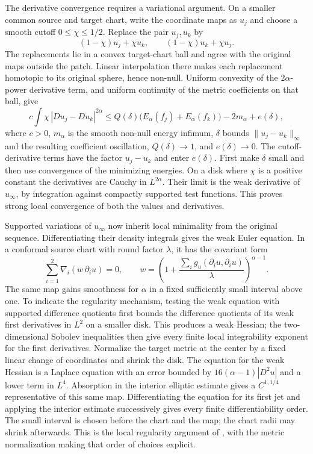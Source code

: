 The derivative convergence requires a variational argument. On a
smaller common source and target chart, write the coordinate maps as
$u_j$ and choose a smooth cutoff $0\leq\chi\leq1/2$. Replace the pair
$u_j,u_k$ by
\[
 (1-\chi)u_j+\chi u_k,\qquad
 (1-\chi)u_k+\chi u_j.
\]
The replacements lie in a convex target-chart ball and agree with the
original maps outside the patch. Linear interpolation there makes
each replacement homotopic to its original sphere, hence non-null.
Uniform convexity of the $2\alpha$-power derivative term, and uniform
continuity of the metric coefficients on that ball, give
\[
 c\int\chi\,|Du_j-Du_k|^{2\alpha}
 \leq Q(\delta)\bigl(E_\alpha(f_j)+E_\alpha(f_k)\bigr)
       -2m_\alpha+e(\delta),
\]
where $c>0$, $m_\alpha$ is the smooth non-null energy infimum,
$\delta$ bounds $\|u_j-u_k\|_\infty$ and the resulting coefficient
oscillation, $Q(\delta)\to1$, and $e(\delta)\to0$.
The cutoff-derivative terms have the factor $u_j-u_k$ and enter
$e(\delta)$. First make $\delta$ small and then use convergence of
the minimizing energies. On a disk where $\chi$ is a positive
constant the derivatives are Cauchy in $L^{2\alpha}$. Their limit is
the weak derivative of $u_\infty$, by integration against compactly
supported test functions. This proves strong local convergence of
both the values and derivatives.

Supported variations of $u_\infty$ now inherit local minimality from
the original sequence. Differentiating their density integrals gives
the weak Euler equation. In a conformal source chart with round
factor $\lambda$, it has the covariant form
\[
 \sum_{i=1}^2\nabla_i(w\,\partial_i u)=0,\qquad
 w=\left(1+\frac{\sum_i g_u(\partial_i u,\partial_i u)}{\lambda}\right)^{\alpha-1}.
\]
The same map gains smoothness for $\alpha$ in a fixed sufficiently
small interval above one. To indicate the regularity mechanism,
testing the weak equation with supported difference quotients first
bounds the difference quotients of its weak first derivatives in
$L^2$ on a smaller disk. This produces a weak Hessian; the
two-dimensional Sobolev inequalities then give every finite local
integrability exponent for the first derivatives. Normalize the
target metric at the center by a fixed linear change of coordinates
and shrink the disk. The equation for the weak Hessian is a Laplace
equation with an error bounded by
$16(\alpha-1)|D^2u|$ and a lower term in $L^4$.
Absorption in the interior elliptic estimate gives a
$C^{1,1/4}$ representative of this same map. Differentiating the
equation for its first jet and applying the interior estimate
successively gives every finite differentiability order. The small
interval is chosen before the chart and the map; the chart radii
may shrink afterwards. This is the local regularity argument of
\cite[Proposition 2.3, p.~7]{SacksUhlenbeck1981}, with the metric
normalization making that order of choices explicit.

